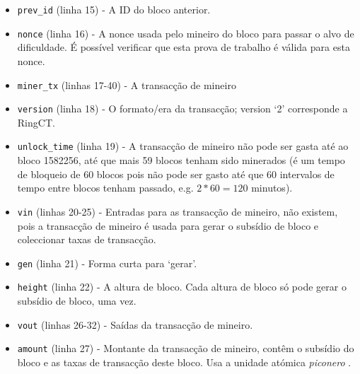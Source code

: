 \begin{appendices}
\begin{itemize}
    \item {\tt prev\_id} (linha 15) - A ID do bloco anterior.
    \item {\tt nonce} (linha 16) - A nonce usada pelo mineiro do bloco para passar o alvo de dificuldade. É possível verificar que esta prova de trabalho é válida para esta nonce.  
    \item {\tt miner\_tx} (linhas 17-40) - A transacção de mineiro
    \item {\tt version} (linha 18) - O formato/era da transacção; version `2' corresponde a RingCT.
    \item {\tt unlock\_time} (linha 19) - A transacção de mineiro não pode ser gasta até ao bloco 1582256, até que mais 59 blocos tenham sido minerados (é um tempo de bloqueio de 60 blocos pois não pode ser gasto até que 60 intervalos de tempo entre blocos tenham passado, e.g. $2*60 = 120$ minutos).
    \item {\tt vin} (linhas 20-25) - Entradas para as transacção de mineiro, não existem, pois a transacção de mineiro é usada para gerar o subsídio de bloco e coleccionar taxas de transacção.
    \item {\tt gen} (linha 21) - Forma curta para `gerar'.
    \item {\tt height} (linha 22) - A altura de bloco. Cada altura de bloco só pode gerar o subsídio de bloco, uma vez.
    \item {\tt vout} (linhas 26-32) - Saídas da transacção de mineiro.
    \item {\tt amount} (linha 27) - Montante da transacção de mineiro, contêm o subsídio do bloco e as taxas de transacção deste bloco. Usa a unidade atómica {\em piconero} . 

\end{itemize}
\end{appendices}
